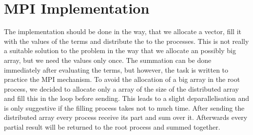\section{MPI Implementation}

The implementation should be done in the way, that we allocate a vector, fill it with the values of the terms and distribute the to the processes. This is not really a suitable solution to the problem in the way that we allocate an possibly big array, but we need the values only once. The summation can be done immediately after evaluating the terms, but however, the task is written to practice the MPI mechanism. To avoid the allocation of a big array in the root process, we decided to allocate only a array of the size of the distributed array and fill this in the loop before sending. This leads to a slight deparallelisation and is only suggestive if the filling process takes not to much time. After sending the distributed array every process receive its part and sum over it. Afterwards every partial result will be returned to the root process and summed together. 

